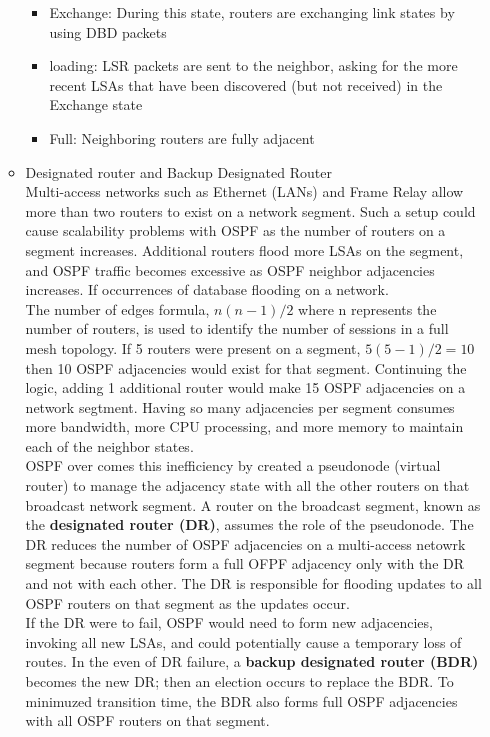 \documentclass{article}
\begin{document}
\begin{itemize}
\begin{itemize}
\begin{itemize}
					\item Exchange: During this state, routers are exchanging link states by using DBD packets 
					\item loading: LSR packets are sent to the neighbor, asking for the more recent LSAs that have been discovered (but not received) in the Exchange state
					\item Full: Neighboring routers are fully adjacent 
				\end{itemize}


			\item Designated router and Backup Designated Router\\
				Multi-access networks such as Ethernet (LANs) and Frame Relay allow more than two routers to exist on a network segment. Such a setup could cause scalability problems with OSPF as the number of routers on a segment increases. Additional routers flood more LSAs on the segment, and OSPF traffic becomes excessive as OSPF neighbor adjacencies increases. If occurrences of database flooding on a network.\\
				
				The number of edges formula, $n(n-1)/2$ where n represents the number of routers, is used to identify the number of sessions in a full mesh topology. If 5 routers were present on a segment, $5(5 - 1)/2 = 10$ then 10 OSPF adjacencies would exist for that segment. Continuing the logic, adding 1 additional router would make 15 OSPF adjacencies on a network segtment. Having so many adjacencies per segment consumes more bandwidth, more CPU processing, and more memory to maintain each of the neighbor states.\\

				OSPF over comes this inefficiency by created a pseudonode (virtual router) to manage the adjacency state with all the other routers on that broadcast network segment. A router on the broadcast segment, known as the \textbf{designated router (DR)}, assumes the role of the pseudonode. The DR reduces the number of OSPF adjacencies on a multi-access netowrk segment because routers form a full OFPF adjacency only with the DR and not with each other. The DR is responsible for flooding updates to all OSPF routers on that segment as the updates occur.\\

				If the DR were to fail, OSPF would need to form new adjacencies, invoking all new LSAs, and could potentially cause a temporary loss of routes. In the even of DR failure, a \textbf{backup designated router (BDR)}  becomes the new DR; then an election occurs to replace the BDR. To minimuzed transition time, the BDR also forms full OSPF adjacencies with all OSPF routers on that segment.\\


\end{itemize}
\end{itemize}
\end{document}
